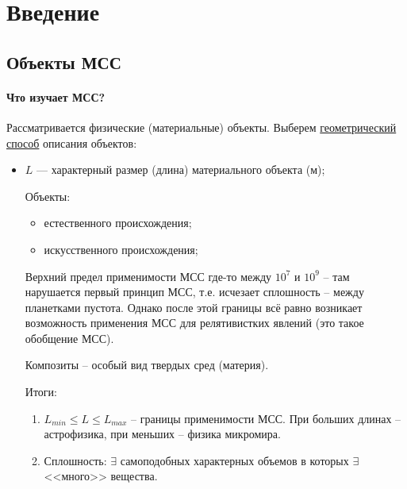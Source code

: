 \section{Введение}

\subsection{Объекты МСС}

\paragraph{Что изучает МСС?}
Рассматривается физические (материальные) объекты. Выберем \underline{геометрический способ}
описания объектов:
\begin{itemize}
  \item $L$ --- характерный размер (длина) материального объекта (м);
    
	\begin{figure}[H]
		\centering
		
	\end{figure}
    
    Объекты:
    \begin{itemize}
      \item естественного происхождения;
      \item искусственного происхождения;
    \end{itemize}

    Верхний предел применимости МСС где-то между $10^7$ и $10^9$ -- там нарушается первый принцип
    МСС, т.е. исчезает сплошность -- между планетками пустота. Однако после этой границы всё равно 
    возникает возможность применения МСС для релятивистких явлений (это такое обобщение МСС).

    Композиты -- особый вид твердых сред (материя).

    Итоги:
    \begin{enumerate}
      \item $L_{min} \leqslant L \leqslant L_{max}$ -- границы применимости МСС. При больших
        длинах -- астрофизика, при меньших -- физика микромира.

      \item Сплошность: $\exists$ самоподобных характерных объемов в которых $\exists$ <<много>>
        вещества.


\end{enumerate}
\end{itemize}
